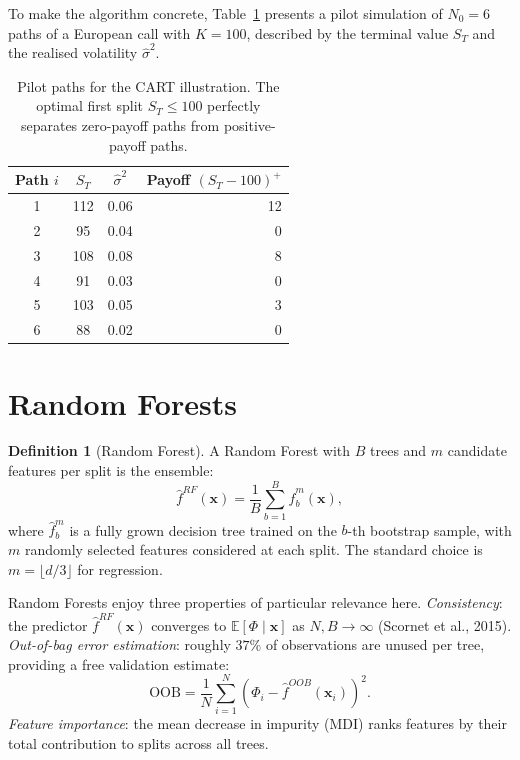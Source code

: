 \documentclass[12pt, a4paper]{report}
\theoremstyle{definition}
\newtheorem{definition}{Definition}[chapter]
\begin{document}
To make the algorithm concrete, Table~\ref{tab:cart-example} presents a
pilot simulation of $N_0 = 6$ paths of a European call with $K = 100$,
described by the terminal value $S_T$ and the realised volatility
$\hat{\sigma}^2$.

\begin{table}[H]
\centering
\caption{Pilot paths for the CART illustration.  The optimal first
         split $S_T \leq 100$ perfectly separates zero-payoff paths
         from positive-payoff paths.}
\label{tab:cart-example}
\renewcommand{\arraystretch}{1.3}
\begin{tabular}{cccr}
\toprule
\textbf{Path} $i$ & $S_T$ & $\hat{\sigma}^2$ & \textbf{Payoff} $(S_T - 100)^+$ \\
\midrule
1 & 112 & 0.06 & 12 \\
2 & 95  & 0.04 & 0  \\
3 & 108 & 0.08 & 8  \\
4 & 91  & 0.03 & 0  \\
5 & 103 & 0.05 & 3  \\
6 & 88  & 0.02 & 0  \\
\bottomrule
\end{tabular}
\end{table}

\section{Random Forests}
\label{sec:rf}

\begin{definition}[Random Forest]
A Random Forest with $B$ trees and $m$ candidate features per split is
the ensemble:
\begin{equation}
    \hat{f}^{RF}(\mathbf{x}) = \frac{1}{B}\sum_{b=1}^{B}
    \hat{f}_b^{m}(\mathbf{x}),
    \label{eq:rf}
\end{equation}
where $\hat{f}_b^m$ is a fully grown decision tree trained on the $b$-th
bootstrap sample, with $m$ randomly selected features considered at each
split.  The standard choice is $m = \lfloor d/3 \rfloor$ for regression.
\end{definition}

Random Forests enjoy three properties of particular relevance here.
\emph{Consistency}: the predictor $\hat{f}^{RF}(\mathbf{x})$ converges
to $\mathbb{E}[\Phi \mid \mathbf{x}]$ as $N, B \to \infty$ (Scornet et
al., 2015).  \emph{Out-of-bag error estimation}: roughly $37\%$ of
observations are unused per tree, providing a free validation estimate:
\begin{equation}
    \mathrm{OOB} = \frac{1}{N}\sum_{i=1}^{N}
    \left(\Phi_i - \hat{f}^{OOB}(\mathbf{x}_i)\right)^2.
    \label{eq:oob}
\end{equation}
\emph{Feature importance}: the mean decrease in impurity (MDI) ranks
features by their total contribution to splits across all trees.
\end{document}
